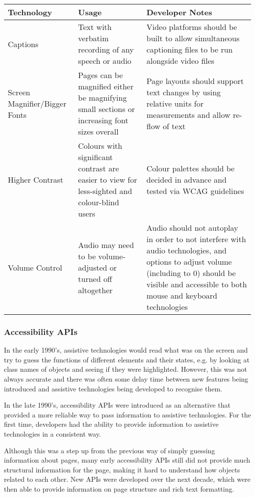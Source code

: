 \documentclass[ %
                    author={Aleena Baig},
                supervisor={Dr Simon Lock},
                    degree={BSc},
                     title={On Making Web Accessible Graphs},
                  subtitle={},
                      year={2019} ]{dissertation}
\begin{document}
\begin{center}
\begin{tabular}{|p{3cm}|p{5cm}|p{5cm}|}
 \hline
 Technology & Usage & Developer Notes \\ [0.5ex] 
 \hline \hline
 Captions & Text with verbatim recording of any speech or audio & Video platforms should be built to allow simultaneous captioning files to be run alongside video files \\ 
 \hline
 Screen Magnifier/Bigger Fonts & Pages can be magnified either be magnifying small sections or increasing font sizes overall & Page layouts should support text changes by using relative units for measurements and allow re-flow of text \\
 \hline
 Higher Contrast & Colours with significant contrast are easier to view for less-sighted and colour-blind users & Colour palettes should be decided in advance and tested via WCAG guidelines \\
 \hline
 Volume Control & Audio may need to be volume-adjusted or turned off altogether & Audio should not autoplay in order to not interfere with audio technologies, and options to adjust volume (including to 0) should be visible and accessible to both mouse and keyboard technologies \\ [1ex] 
 \hline
\end{tabular}
\end{center}


\subsubsection{Accessibility APIs}

In the early 1990's, assistive technologies would read what was on the screen and try to guess the functions of different elements and their states, e.g. by looking at class names of objects and seeing if they were highlighted. However, this was not always accurate and there was often some delay time between new features being introduced and assistive technologies being developed to recognise them. \cite{smashingAPIs}

In the late 1990's, accessibility APIs were introduced as an alternative that provided a more reliable way to pass information to assistive technologies. For the first time, developers had the ability to provide information to assistive technologies in a consistent way.

Although this was a step up from the previous way of simply guessing information about pages, many early accessibility APIs still did not provide much structural information for the page, making it hard to understand how objects related to each other. New APIs were developed over the next decade, which were then able to provide information on page structure and rich text formatting.
\end{document}
